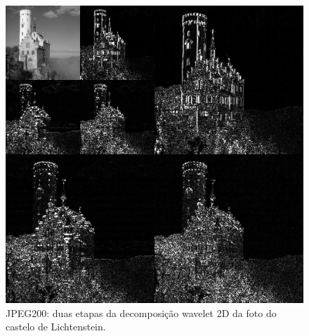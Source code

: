 \begin{frame}[allowframebreaks]
  \begin{figure}[hptb]
  \centering
  \includegraphics[width=.5\textwidth]{images/wavelet_lichtenstein.png}
  \caption{JPEG200: duas etapas da decomposição wavelet 2D da foto do castelo de Lichtenstein.}
  \label{fig:wlichtenstein}
  \end{figure}

\end{frame}







